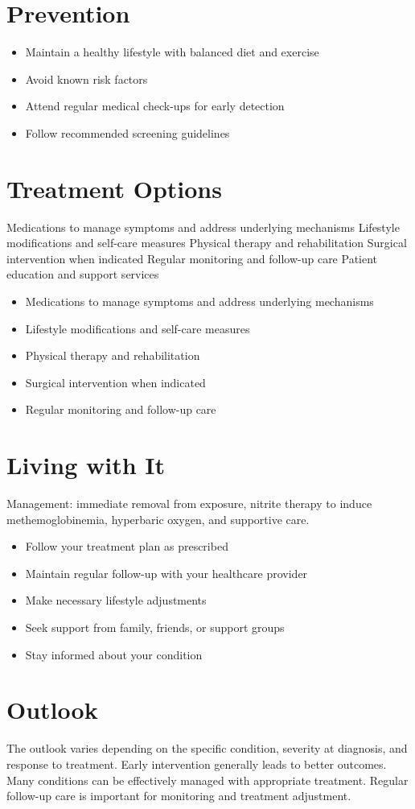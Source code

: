 \section{Prevention}
\begin{itemize}[noitemsep]
  \item Maintain a healthy lifestyle with balanced diet and exercise
  \item Avoid known risk factors
  \item Attend regular medical check-ups for early detection
  \item Follow recommended screening guidelines
\end{itemize}
\section{Treatment Options}
Medications to manage symptoms and address underlying mechanisms Lifestyle modifications and self-care measures Physical therapy and rehabilitation Surgical intervention when indicated Regular monitoring and follow-up care Patient education and support services

\begin{itemize}[noitemsep]
  \item Medications to manage symptoms and address underlying mechanisms
  \item Lifestyle modifications and self-care measures
  \item Physical therapy and rehabilitation
  \item Surgical intervention when indicated
  \item Regular monitoring and follow-up care
\end{itemize}
\section{Living with It}
Management: immediate removal from exposure, nitrite therapy to induce methemoglobinemia, hyperbaric oxygen, and supportive care.

\begin{itemize}[noitemsep]
  \item Follow your treatment plan as prescribed
  \item Maintain regular follow-up with your healthcare provider
  \item Make necessary lifestyle adjustments
  \item Seek support from family, friends, or support groups
  \item Stay informed about your condition
\end{itemize}
\section{Outlook}
The outlook varies depending on the specific condition, severity at diagnosis, and response to treatment. Early intervention generally leads to better outcomes. Many conditions can be effectively managed with appropriate treatment. Regular follow-up care is important for monitoring and treatment adjustment.
